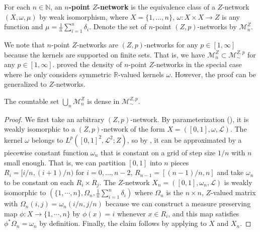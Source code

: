 \documentclass[twoside,11pt]{article}
\theoremstyle{definition}
\newcommand{\M}{\mathcal{M}}
\newcommand{\MZp}{\M_{\sim}^{Z,p}}
\newcommand{\dgwz}{\mathrm{GW}_p^Z}
\newcommand{\define}[1]{\textbf{#1}}
\begin{document}
\begin{definition}
    For each $n\in \mathbb{N}$, an \define{$n$-point $Z$-network} is the equivalence class of a $Z$-network $(X,\omega, \mu)$ by weak isomorphism,  where $X=\{1,\ldots, n\}$, $\omega:X\times X\to Z$ is any function and $\mu= \frac{1}{n}\sum_{i=1}^{n}\delta_{i}$. Denote the set of $n$-point $(Z,p)$-networks by $\M^{Z}_n$.
\end{definition}

We note that $n$-point $Z$-networks are $(Z,p)$-networks for any $p\in[1,\infty]$ because the kernels are supported on finite sets. That is, we have $\M^{Z}_n \subset \MZp$ for any $p\in [1,\infty]$. \citet{sturm2023space} proved the density of $n$-point $Z$-networks in the special case where he only considers symmetric $\mathbb{R}$-valued kernels $\omega$. However, the proof can be generalized to $Z$-networks.

\begin{proposition}\label{prop:dense_subset}
    The countable set $\bigcup_{n}\M^{Z}_n$ is dense in $\MZp$.
\end{proposition}
\begin{proof}
    We first take an arbitrary $(Z,p)$-network. By parameterization (), it is weakly isomorphic to a $(Z,p)$-network of the form $X=([0,1],\omega, \mathscr{L})$. The kernel $\omega$ belongs to $L^p([0,1]^2, \mathscr{L}^2; Z)$, so by , it can be approximated by a piecewise constant function $\omega_n$ that is constant on a grid of step size $1/n$ with $n$ small enough. That is, we can partition $[0,1]$ into $n$ pieces $R_i = [i/n, (i+1)/n)$ for $i=0,\ldots, n-2$, $R_{n-1}=[(n-1)/n,n]$ and take $\omega_n$ to be constant on each $R_i\times R_j$. The $Z$-network $X_n=([0,1],\omega_n, \mathscr{L})$ is weakly isomorphic to $(\{1,\cdots, n\}, \Omega_n, \frac{1}{n}\sum_{i=1}^{n}\delta_i)$ where $\Omega_n$ is the $n\times n$, $Z$-valued matrix with $\Omega_n(i,j) = \omega_n(i/n, j/n)$ because we can construct a measure preserving map $\phi: X\to \{1,\cdots , n\}$ by $\phi(x) = i$ whenever $x\in R_i$, and this map satisfies $\phi^*\Omega_n = \omega_n$ by definition. Finally, the claim follows by applying  to $X$ and $X_n$.
\end{proof}
\end{document}
